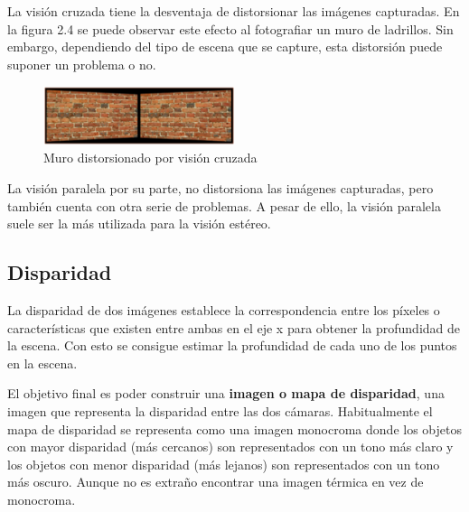 La visión cruzada tiene la desventaja de distorsionar las imágenes capturadas.
En la figura 2.4 se puede observar este efecto al fotografiar un muro de
ladrillos. Sin embargo, dependiendo del tipo de escena que se capture, esta
distorsión puede suponer un problema o no.

\begin{figure}[!th]
  \begin{center}
    \includegraphics[width=0.5\textwidth]{images/cap2/VisionCruzadaMuro.eps}
    \caption{Muro distorsionado por visión cruzada}
    \label{fig:VisionCruzadaMuro}
  \end{center}
\end{figure}

La visión paralela por su parte, no distorsiona las imágenes capturadas, pero
también cuenta con otra serie de problemas. A pesar de ello, la visión paralela
suele ser la más utilizada para la visión estéreo.


\subsection{Disparidad}
La disparidad de dos imágenes establece la correspondencia entre los píxeles o
características que existen entre ambas en el eje x para obtener la profundidad
de la escena. Con esto se consigue estimar la profundidad de cada uno de los
puntos en la escena.

El objetivo final es poder construir una \textbf{imagen o mapa de disparidad},
una imagen que representa la disparidad entre las dos cámaras. Habitualmente
el mapa de disparidad se representa como una imagen monocroma donde los objetos
con mayor disparidad (más cercanos) son representados con un tono más claro y
los objetos con menor disparidad (más lejanos) son representados con un tono más
oscuro. Aunque no es extraño encontrar una imagen térmica en vez de monocroma.

